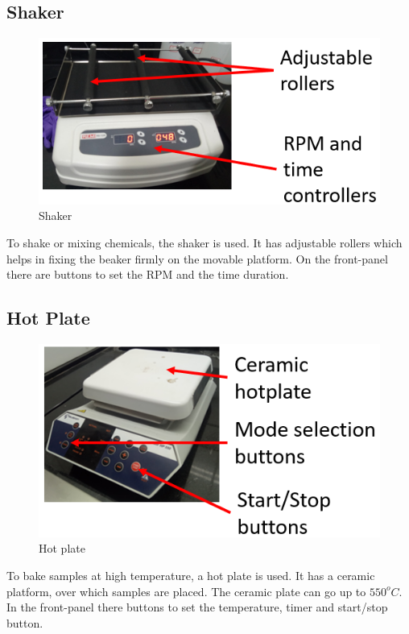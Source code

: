 \subsection{Shaker}
\begin{figure}[H]
	\centering
   \includegraphics[scale=0.56]{Images/5.png} 
   \caption{Shaker}
\end{figure}
To shake or mixing chemicals, the shaker is used. It has adjustable rollers which helps in fixing the beaker firmly on the movable platform. On the front-panel there are buttons to set the RPM and the time duration.

\subsection{Hot Plate}
\begin{figure}[H]
	\centering
   \includegraphics[scale=0.56]{Images/6.png} 
   \caption{Hot plate}
\end{figure}
To bake samples at high temperature, a hot plate is used. It has a ceramic platform, over which samples are placed. The ceramic plate can go up to $550^o C$. In the front-panel there buttons to set the temperature, timer and start/stop button. 

